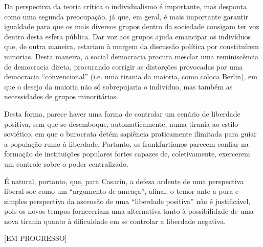 \documentclass[12pt,a4paper]{article}
\begin{document}
	Da perspectiva da teoria crítica o individualismo é importante, 
	mas desponta como uma segunda preocupação, já que, em geral, é 
	mais importante garantir igualdade para que os mais diversos grupos 
	dentro da sociedade consigam ter voz dentro desta esfera pública. 
	Dar voz aos grupos ajuda emancipar os indivíduos que, de outra 
	maneira, estariam à margem da discussão política por constituírem 
	minorias. Desta maneira, a social democracia procura mesclar uma 
	reminiscência de democracia direta, procurando corrigir as distorções 
	provocadas por uma democracia “convencional” (i.e. uma tirania da 
	maioria, como coloca Berlin), em que o desejo da maioria não só 
	sobrepujaria o indivíduo, mas também as necessidades de grupos 
	minoritários. 

	Desta forma, parece haver uma forma de controlar um cenário de 
	liberdade positiva, sem que se desemboque, automaticamente, numa 
	tirania ao estilo soviético, em que o burocrata detém sapiência 
	praticamente ilimitada para guiar a população rumo à liberdade. 
	Portanto, os frankfurtianos parecem confiar na formação de 
	instituições populares fortes capazes de, coletivamente, exercerem 
	um controle sobre o poder centralizado. 
	
	É natural, portanto, que, para Casarin, a defesa ardente de uma 
	perspectiva liberal soe como um “argumento de ameaça”, afinal, 
	o temor ante a pura e simples perspectiva da ascensão de uma 
	“liberdade positiva” não é justificável, pois os novos tempos 
	forneceriam uma alternativa tanto à possibilidade de uma nova 
	tirania quanto à dificuldade em se controlar a liberdade negativa. 
	
	[EM PROGRESSO]

	
	
	
\end{document}
